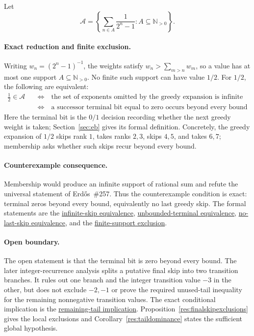 \documentclass[11pt]{article}
\newcommand{\commit}{312b96c0d149ed466725c62d4ef24cfc91bca34e}
\newcommand{\repobase}{https://github.com/wcook04/plectis-lean-erdos249-257/blob/\commit}
\newcommand{\PK}{Erdos249257}
\newcommand{\lword}[4]{\href{\repobase/\PK/#1\#L#2}{#4}}
\theoremstyle{definition}
\theoremstyle{remark}
\newcommand{\Npos}{\mathbb{N}_{>0}}
\begin{document}
Let
\[
  \mathcal A=\left\{\sum_{n\in A}\frac1{2^n-1}:A\subseteq\Npos\right\}.
\]

\paragraph{Exact reduction and finite exclusion.}
Writing \(w_n=(2^n-1)^{-1}\), the weights satisfy
\(w_n>\sum_{m>n}w_m\), so a value has at most one support
\(A\subseteq\Npos\).  No finite such support can have value \(1/2\).  For
\(1/2\), the following are equivalent:
\[
\begin{aligned}
\frac12\in\mathcal A
&\quad\Longleftrightarrow\quad
\text{the set of exponents omitted by the greedy expansion is infinite}\\
&\quad\Longleftrightarrow\quad
\text{a successor terminal bit equal to zero occurs beyond every bound}
\end{aligned}
\]
Here the terminal bit is the \(0/1\) decision recording whether the next
greedy weight is taken; Section~\ref{sec:eb} gives its formal definition.
Concretely, the greedy expansion of \(1/2\) skips rank \(1\), takes ranks
\(2,3\), skips \(4,5\), and takes \(6,7\); membership asks whether such
skips recur beyond every bound.

\paragraph{Counterexample consequence.}
Membership would produce an infinite support of rational sum and refute the
universal statement of Erd\H{o}s~\#257.  Thus the counterexample condition is
exact: terminal zeros beyond every bound, equivalently no last greedy skip.
The formal statements are the
\lword{GreedyAchievementSet.lean}{2514}{half_mem_mersenneAchievementSet_iff_greedySkippedSupport_infinite}{infinite-skip equivalence},
\lword{HalfCylinderHalfMembershipClassification.lean}{126}{half_mem_mersenneAchievementSet_iff_unboundedTerminalFalse}{unbounded-terminal equivalence},
\lword{HalfCylinderHalfMembershipClassification.lean}{235}{half_mem_mersenneAchievementSet_iff_no_lastHalfGreedySkip}{no-last-skip equivalence},
and the
\lword{HalfCarryReachability.lean}{589}{finite_boolSupport_ne_half}{finite-support exclusion}.

\paragraph{Open boundary.}
The open statement is that the terminal bit is zero beyond every bound.  The
later integer-recurrence analysis splits a putative final skip into two
transition branches.  It rules out one branch and the integer transition value
\(-3\) in the other, but does not exclude \(-2,-1\) or prove the required
unused-tail inequality for the remaining nonnegative transition values.  The exact
conditional implication is the
\lword{HalfCylinderLastProducerContradiction.lean}{436}{half_mem_mersenneAchievementSet_of_middleProducerTailEscapeExceptNegThree}{remaining-tail implication}.
Proposition~\ref{res:finalskipexclusions} gives the local exclusions and
Corollary~\ref{res:taildominance} states the sufficient global hypothesis.
\end{document}
